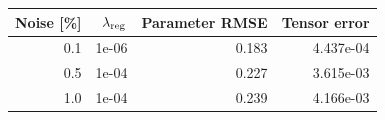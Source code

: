 \begin{tabular}{rrrr}
\toprule
Noise [\%] & $\lambda_{\rm reg}$ & Parameter RMSE & Tensor error \\
\midrule
0.1 & 1e-06 & 0.183 & 4.437e-04 \\
0.5 & 1e-04 & 0.227 & 3.615e-03 \\
1.0 & 1e-04 & 0.239 & 4.166e-03 \\
\bottomrule
\end{tabular}
